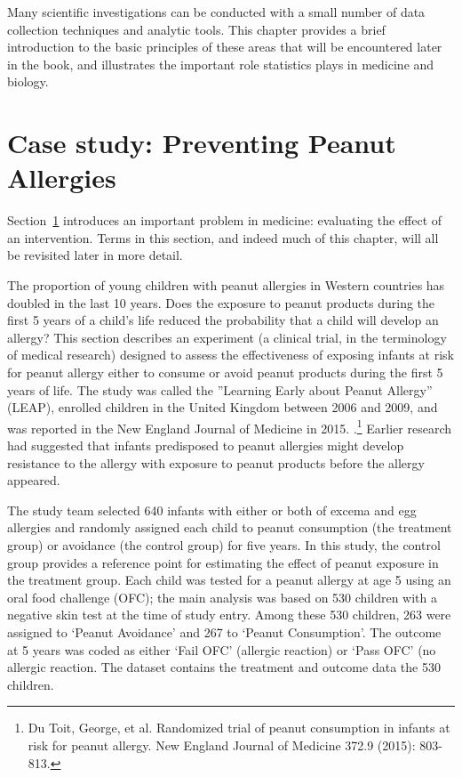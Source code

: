 \begin{doublespace}
Many scientific investigations can be conducted with a small number of data collection techniques and analytic tools. This chapter provides a brief introduction to the basic principles of these areas that will be encountered later in the book, and illustrates the important role statistics plays in medicine and biology.

\section[Case study]{Case study: Preventing Peanut Allergies}
\label{basicExampleOfPeanutAllergies}


 Section~\ref{basicExampleOfPeanutAllergies} introduces an important problem in medicine: evaluating the effect of an intervention. Terms in this section, and indeed much of this chapter, will all be revisited later in more detail.

The proportion of young children with peanut allergies in Western countries has doubled in the last 10 years. Does the exposure to peanut products during the first 5 years of a child's life reduced the probability that a child will develop an allergy?  This section describes an experiment (a clinical trial, in the terminology of medical research) designed to assess the effectiveness of exposing infants at risk for peanut allergy either to consume or avoid peanut products during the first 5 years of life.  The study was called the ''Learning Early about Peanut Allergy'' (LEAP), enrolled children in the United Kingdom between 2006 and 2009, and was reported in the New England Journal of Medicine in 2015. .\footnote{Du Toit, George, et al. Randomized trial of peanut consumption in infants at risk for peanut allergy. New England Journal of Medicine 372.9 (2015): 803-813.}  Earlier research had suggested that infants predisposed to peanut allergies might develop resistance to the allergy with exposure to peanut products before the allergy appeared.

The study team selected 640 infants with either or both of excema and egg allergies and randomly assigned each child to peanut consumption (the treatment group) or avoidance (the control group) for five years. In this study, the control group provides a reference point for estimating the effect of peanut exposure in the treatment group. Each child was tested for a peanut allergy at age 5 using an oral food challenge (OFC); the main analysis was based on 530 children with a negative skin test at the time of study entry. Among these 530 children, 263 were assigned to `Peanut Avoidance' and 267 to `Peanut Consumption'. The outcome at 5 years was coded as either `Fail OFC' (allergic reaction) or `Pass OFC' (no allergic reaction. The dataset  contains the treatment and outcome data the 530 children.


\end{doublespace}
